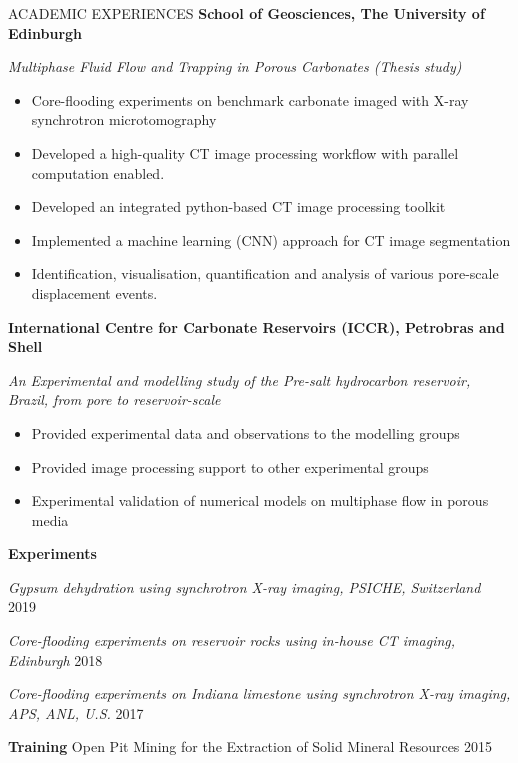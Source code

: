\documentclass{resume} %
\newenvironment{indentpar}[1]%
  {\begin{list}{}%
          {\setlength{\leftmargin}{#1}}%
          \item[]%
  }
  {\end{list}}
\begin{document}
\newpage
\begin{rSection}{ACADEMIC EXPERIENCES}
\textbf{School of Geosciences, The University of Edinburgh} 
\begin{indentpar}{0.5cm}
\textit{Multiphase Fluid Flow and Trapping in Porous Carbonates (Thesis study)}
\begin{itemize}
    \item Core-flooding experiments on benchmark carbonate imaged with X-ray synchrotron microtomography
    \item Developed a high-quality CT image processing workflow with parallel computation enabled.
    \item Developed an integrated python-based CT image processing toolkit 
    \item Implemented a machine learning (CNN) approach for CT image segmentation
    \item Identification, visualisation, quantification and analysis of various pore-scale displacement events.
\end{itemize}
\end{indentpar}

\textbf{International Centre for Carbonate Reservoirs (ICCR), Petrobras and Shell} 
\begin{indentpar}{0.5cm}
\textit{An Experimental and modelling study of the Pre-salt hydrocarbon reservoir, Brazil, from pore to reservoir-scale}
\begin{itemize}
    \item Provided experimental data and observations to the modelling groups 
    \item Provided image processing support to other experimental groups
    \item Experimental validation of numerical models on multiphase flow in porous media
\end{itemize}
\end{indentpar}
\textbf{Experiments} 

\begin{indentpar}{0.5cm}
\textit{Gypsum dehydration using synchrotron X-ray imaging, PSICHE, Switzerland} \hfill {2019}

\textit{Core-flooding experiments on reservoir rocks using in-house CT imaging, Edinburgh} \hfill {2018}

\textit{Core-flooding experiments on Indiana limestone using synchrotron X-ray imaging, APS, ANL, U.S.} \hfill {2017}
\end{indentpar}

\textbf{Training} Open Pit Mining for the Extraction of Solid Mineral Resources \hfill {2015}


\end{rSection}
\end{document}
